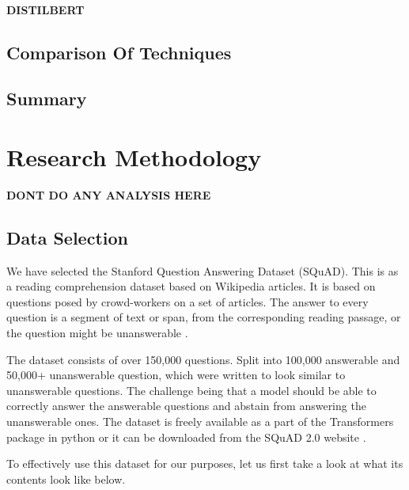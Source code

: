 \documentclass[12pt]{report}
\begin{document}
	       \subsubsection{DISTILBERT}\label{2324}
	       \cite{distil}
        \section{Comparison Of Techniques}\label{24}
        \section{Summary}\label{25}
        \citep{RAM}

    \chapter{\centering Research Methodology}\label{c3researchmeth}
    \textbf{DONT DO ANY ANALYSIS HERE}
    \section{Data Selection}\label{c31}
    	We have selected the Stanford Question Answering Dataset (SQuAD). This is as a reading comprehension dataset based on Wikipedia articles. It is based on questions posed by crowd-workers on a set of articles. The answer to every question is a segment of text or span, from the corresponding reading passage, or the question might be unanswerable \citep{dataset}.

    The dataset consists of over 150,000 questions. Split into 100,000 answerable and 50,000+ unanswerable question, which were written to look similar to unanswerable questions. The challenge being that a model should be able to correctly answer the answerable questions and abstain from answering the unanswerable ones.
    The dataset is freely available as a part of the Transformers package in python or it can be downloaded from the SQuAD 2.0 website \citep{squad}.

    To effectively use this dataset for our purposes, let us first take a look at what its contents look like below.\\ \\
    \noindent{}
    \\ \\
\end{document}
